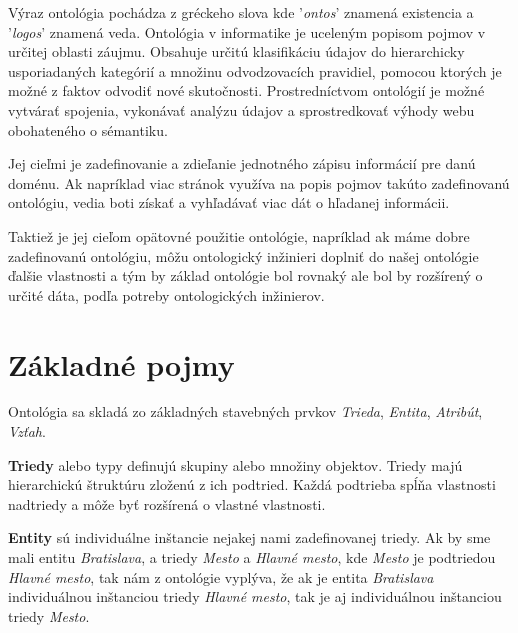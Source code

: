 \documentclass[12pt, a4paper, oneside]{book}
\begin{document}
Výraz ontológia \cite{ontology} pochádza z gréckeho slova kde '\textit{ontos}' znamená existencia a '\textit{logos}' znamená veda. Ontológia v informatike je uceleným popisom pojmov v určitej oblasti záujmu. Obsahuje určitú klasifikáciu údajov do hierarchicky usporiadaných kategórií a množinu odvodzovacích pravidiel, pomocou ktorých je možné z faktov odvodiť nové skutočnosti. Prostredníctvom ontológií je možné vytvárať spojenia, vykonávať analýzu údajov a sprostredkovať výhody webu obohateného o sémantiku. 


Jej cieľmi je zadefinovanie a zdieľanie jednotného zápisu informácií pre danú doménu. Ak napríklad viac stránok využíva na popis pojmov takúto zadefinovanú ontológiu, vedia boti získať a vyhľadávať viac dát o hľadanej informácii.


Taktiež je jej cieľom opätovné použitie ontológie, napríklad ak máme dobre zadefinovanú ontológiu, môžu ontologický inžinieri doplniť do našej ontológie ďalšie vlastnosti a tým by základ ontológie bol rovnaký ale bol by rozšírený o určité dáta, podľa potreby ontologických inžinierov.



\section{Základné pojmy}
Ontológia sa skladá zo základných stavebných prvkov \textit{Trieda}, \textit{Entita}, \textit{Atribút}, \textit{Vzťah}. 


\textbf{Triedy} alebo typy definujú skupiny alebo množiny objektov. Triedy majú hierarchickú štruktúru zloženú z ich podtried. Každá podtrieba spĺňa vlastnosti nadtriedy a môže byť rozšírená o vlastné vlastnosti.


\textbf{Entity} sú individuálne inštancie nejakej nami zadefinovanej triedy. Ak by sme mali entitu \textit{Bratislava}, a triedy \textit{Mesto} a \textit{Hlavné mesto}, kde \textit{Mesto} je podtriedou \textit{Hlavné mesto}, tak nám z ontológie vyplýva, že ak je entita \textit{Bratislava} individuálnou inštanciou triedy \textit{Hlavné mesto}, tak je aj individuálnou inštanciou triedy \textit{Mesto}.

\end{document}
